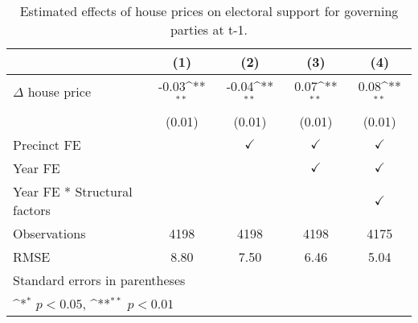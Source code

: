 \begin{table}[htbp]\centering
\def\sym#1{\ifmmode^{#1}\else\(^{#1}\)\fi}
\caption{Estimated effects of house prices on electoral support for governing parties at t-1.} \label{tab3}
\begin{tabular}{l*{4}{c}}
\hline\hline
                    &\multicolumn{1}{c}{(1)}        &\multicolumn{1}{c}{(2)}        &\multicolumn{1}{c}{(3)}        &\multicolumn{1}{c}{(4)}        \\
\hline
$\Delta$ house price&       -0.03\sym{**}&       -0.04\sym{**}&        0.07\sym{**}&        0.08\sym{**}\\
                    &      (0.01)        &      (0.01)        &      (0.01)        &      (0.01)        \\
[1em]
\hline Precinct FE  &                    &$\checkmark$        &$\checkmark$        &$\checkmark$        \\
[1em]
Year FE             &                    &                    &$\checkmark$        &$\checkmark$        \\
[1em]
Year FE * Structural factors&                    &                    &                    &$\checkmark$        \\
\hline
Observations        &        4198        &        4198        &        4198        &        4175        \\
RMSE                &        8.80        &        7.50        &        6.46        &        5.04        \\
\hline\hline
\multicolumn{5}{l}{\footnotesize Standard errors in parentheses}\\
\multicolumn{5}{l}{\footnotesize \sym{*} \(p<0.05\), \sym{**} \(p<0.01\)}\\
\end{tabular}
\end{table}
